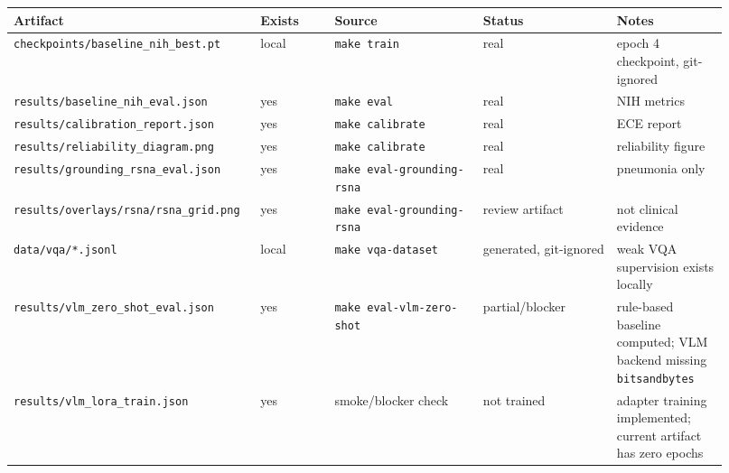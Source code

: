 \begin{longtable}{p{0.29\linewidth} p{0.1\linewidth} p{0.2\linewidth} p{0.18\linewidth} p{0.15\linewidth}}
\toprule
Artifact & Exists & Source & Status & Notes \\
\midrule
\endhead
\texttt{checkpoints/baseline\_nih\_best.pt} & local & \texttt{make train} & real & epoch 4 checkpoint, git-ignored \\
\texttt{results/baseline\_nih\_eval.json} & yes & \texttt{make eval} & real & NIH metrics \\
\texttt{results/calibration\_report.json} & yes & \texttt{make calibrate} & real & ECE report \\
\texttt{results/reliability\_diagram.png} & yes & \texttt{make calibrate} & real & reliability figure \\
\texttt{results/grounding\_rsna\_eval.json} & yes & \texttt{make eval-grounding-rsna} & real & pneumonia only \\
\texttt{results/overlays/rsna/rsna\_grid.png} & yes & \texttt{make eval-grounding-rsna} & review artifact & not clinical evidence \\
\texttt{data/vqa/*.jsonl} & local & \texttt{make vqa-dataset} & generated, git-ignored & weak VQA supervision exists locally \\
\texttt{results/vlm\_zero\_shot\_eval.json} & yes & \texttt{make eval-vlm-zero-shot} & partial/blocker & rule-based baseline computed; VLM backend missing \texttt{bitsandbytes} \\
\texttt{results/vlm\_lora\_train.json} & yes & smoke/blocker check & not trained & adapter training implemented; current artifact has zero epochs \\
\bottomrule
\end{longtable}
